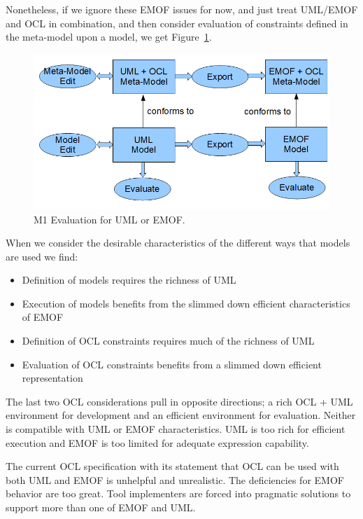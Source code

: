 \documentclass{eceasst}
\begin{document}
Nonetheless, if we ignore these EMOF issues for now, and just treat UML/EMOF and OCL in combination, and then consider evaluation of constraints defined in the meta-model upon a model, we get Figure~\ref{fig:M2Evaluation}.

\begin{figure}
  \begin{center}
    \includegraphics[width=4.5in]{M2Evaluation.png}
  \end{center}
  \caption{M1 Evaluation for UML or EMOF.}
  \label{fig:M2Evaluation}
\end{figure}

When we consider the desirable characteristics of the different ways that models are used we find:
\begin{itemize}
\item Definition of models requires the richness of UML
\item Execution of models benefits from the slimmed down efficient characteristics of EMOF 
\item Definition of OCL constraints requires much of the richness of UML
\item Evaluation of OCL constraints benefits from a slimmed down efficient representation
\end{itemize}

The last two OCL considerations pull in opposite directions; a rich OCL + UML environment for development and an efficient environment for evaluation. Neither is compatible with UML or EMOF characteristics. UML is too rich for efficient execution and EMOF is too limited for adequate expression capability.

The current OCL specification with its statement that OCL can be used with both UML and EMOF is unhelpful and unrealistic. The deficiencies for EMOF behavior are too great. Tool implementers are forced into pragmatic solutions to support more than one of EMOF and UML. 
\end{document}
